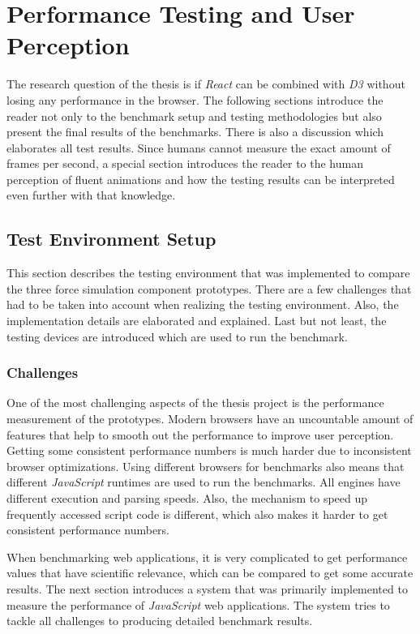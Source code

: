 \chapter{Performance Testing and User Perception}
\label{cha:performance}

The research question of the thesis is if \emph{React} can be combined with \emph{D3} without losing any performance in the browser. The following sections introduce the reader not only to the benchmark setup and testing methodologies but also present the final results of the benchmarks. There is also a discussion which elaborates all test results. Since humans cannot measure the exact amount of frames per second, a special section introduces the reader to the human perception of fluent animations and how the testing results can be interpreted even further with that knowledge.

\section{Test Environment Setup}

This section describes the testing environment that was implemented to compare the three force simulation component prototypes. There are a few challenges that had to be taken into account when realizing the testing environment. Also, the implementation details are elaborated and explained. Last but not least, the testing devices are introduced which are used to run the benchmark.

\subsection{Challenges}

One of the most challenging aspects of the thesis project is the performance measurement of the prototypes. Modern browsers have an uncountable amount of features that help to smooth out the performance to improve user perception. Getting some consistent performance numbers is much harder due to inconsistent browser optimizations. Using different browsers for benchmarks also means that different \emph{JavaScript} runtimes are used to run the benchmarks. All engines have different execution and parsing speeds. Also, the mechanism to speed up frequently accessed script code is different, which also makes it harder to get consistent performance numbers.

When benchmarking web applications, it is very complicated to get performance values that have scientific relevance, which can be compared to get some accurate results. The next section introduces a system that was primarily implemented to measure the performance of \emph{JavaScript} web applications. The system tries to tackle all challenges to producing detailed benchmark results.

